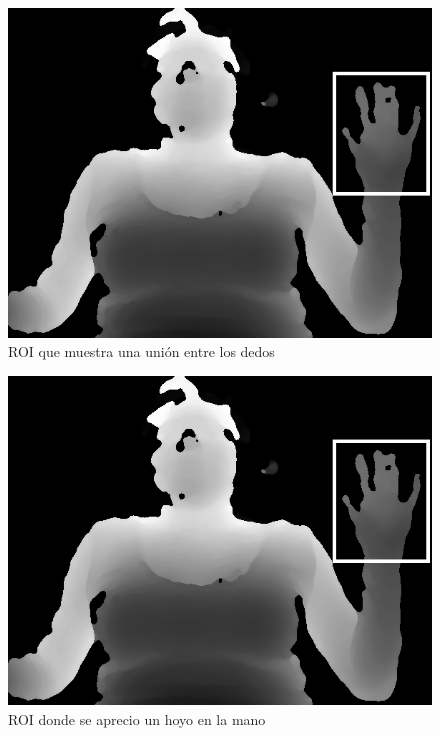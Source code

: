 \begin{figure}[!h]
\begin{center}
\includegraphics[scale=.5]{./Figures/roi.png}
\end{center}
\caption{ROI que muestra una unión entre los dedos}
\label{fig:RuidoUnion}
\end{figure}   

\begin{figure}[!h]
\begin{center}
\includegraphics[scale=.5]{./Figures/roi.png}
\end{center}
\caption{ROI donde se aprecio un hoyo en la mano}
\label{fig:RuidoHoyo}
\end{figure}  


